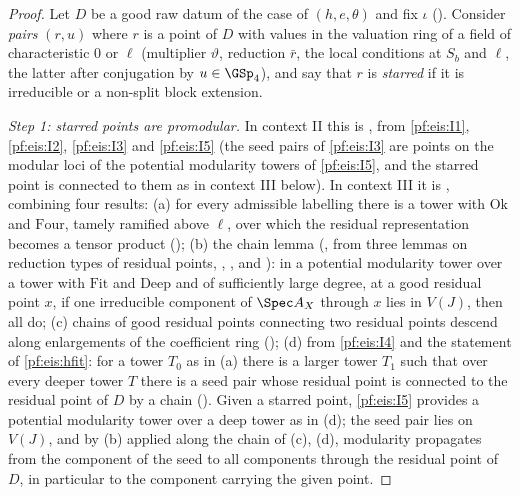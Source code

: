 \begin{proof}
Let $D$ be a good raw datum of the case of $(h,e,\theta)$ and fix $\iota$ (). Consider \emph{pairs} $(r,u)$ where
$r$ is a point of $D$ with values in the valuation ring of a field of characteristic $0$ or $\ell$ (multiplier $\vartheta$, reduction $\bar r$, the local
conditions at $S_b$ and $\ell$, the latter after conjugation by $u\in\GSp_4$), and say that $r$ is \emph{starred} if it is irreducible or a non-split
block extension.

\emph{Step 1: starred points are promodular.} In context II this is ,
from \ref{pf:eis:I1}, \ref{pf:eis:I2}, \ref{pf:eis:I3} and \ref{pf:eis:I5} (the seed pairs of \ref{pf:eis:I3} are points on the modular loci of
the potential modularity towers of \ref{pf:eis:I5}, and the starred point is connected to them as in context III below). In context III it is
, combining four results:
(a) for every admissible labelling there is a tower with $\mathrm{Ok}$ and $\mathrm{Four}$, tamely ramified above $\ell$, over which the residual
representation becomes a tensor product ();
(b) the chain lemma (, from three lemmas on reduction types of residual
points, , , and ): in a potential modularity
tower over a tower with $\mathrm{Fit}$ and $\mathrm{Deep}$ and of sufficiently large degree, at a good residual point $x$, if one irreducible
component of $\Spec A_X$ through $x$ lies in $V(J)$, then all do;
(c) chains of good residual points connecting two residual points descend along enlargements of the coefficient ring
();
(d) from \ref{pf:eis:I4} and the statement of \cref{pf:eis:hfit}: for a tower $T_0$ as in (a) there is a larger tower $T_1$ such that over every deeper
tower $T$ there is a seed pair whose residual point is connected to the residual point of $D$ by a chain ().
Given a starred point, \ref{pf:eis:I5} provides a potential modularity tower over a deep tower as in (d); the seed pair lies on $V(J)$, and by (b)
applied along the chain of (c), (d), modularity propagates from the component of the seed to all components through the residual point of
$D$, in particular to the component carrying the given point.


\end{proof}
